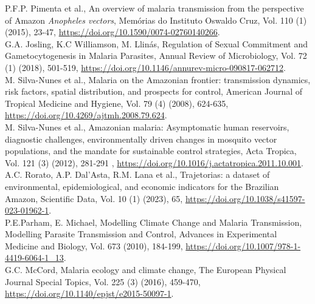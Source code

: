 \documentclass[a4paper,fleqn]{cas-dc}
\begin{document}
\begin{thebibliography}{00}
 P.F.P. Pimenta et al., An overview of malaria transmission from the perspective of Amazon \emph{Anopheles vectors}, Memórias do Instituto Oswaldo Cruz, Vol. 110 (1) (2015), 23-47, \href{https://doi.org/10.1590/0074-02760140266}{https://doi.org/10.1590/0074-02760140266}.
\\
 G.A. Josling, K.C Williamson, M. Llinás, Regulation of Sexual Commitment and Gametocytogenesis in Malaria Parasites, Annual Review of Microbiology, Vol. 72 (1) (2018), 501-519, \href{https://doi.org/10.1146/annurev-micro-090817-062712}{https://doi.org/10.1146/annurev-micro-090817-062712}.
\\
 M. Silva-Nunes et al., Malaria on the Amazonian frontier: transmission dynamics, risk factors, spatial distribution, and prospects for control, American Journal of Tropical Medicine and Hygiene, Vol. 79 (4) (2008), 624-635, \href{https://doi.org/10.4269/ajtmh.2008.79.624}{https://doi.org/10.4269/ajtmh.2008.79.624}. 
\\
 M. Silva-Nunes et al.,  Amazonian malaria: Asymptomatic human reservoirs, diagnostic challenges, environmentally driven changes in mosquito vector populations, and the mandate for sustainable control strategies, Acta Tropica, Vol. 121 (3) (2012), 281-291 , \href{https://doi.org/10.1016/j.actatropica.2011.10.001}{https://doi.org/10.1016/j.actatropica.2011.10.001}.
\\
 A.C. Rorato, A.P. Dal’Asta, R.M. Lana et al., Trajetorias: a dataset of environmental, epidemiological, and economic indicators for the Brazilian Amazon, Scientific Data, Vol. 10 (1) (2023), 65, \href{https://doi.org/10.1038/s41597-023-01962-1}{https://doi.org/10.1038/s41597-023-01962-1}.
\\
 P.E.Parham, E. Michael, Modelling Climate Change and Malaria Transmission, Modelling Parasite Transmission and Control, Advances in Experimental Medicine and Biology, Vol. 673 (2010), 184-199, \href{https://doi.org/10.1007/978-1-4419-6064-1_13}{https://doi.org/10.1007/978-1-4419-6064-1\_13}.
\\
 G.C. McCord, Malaria ecology and climate change, The European Physical Journal Special Topics, Vol. 225 (3) (2016), 459-470, \href{https://doi.org/10.1140/epjst/e2015-50097-1}{https://doi.org/10.1140/epjst/e2015-50097-1}.
\\

\end{thebibliography}
\end{document}

